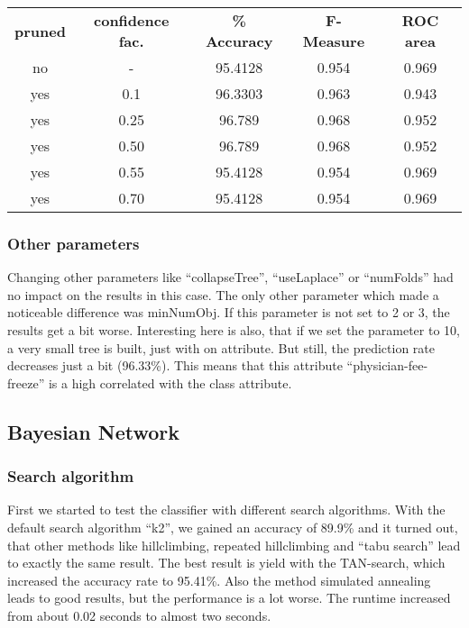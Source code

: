 \documentclass{sig-alternate-05-2015}
\begin{document}
{\begin{center}
\begin{tabular}{ c | c | c | c | c }
\textbf{pruned} & \textbf{confidence fac.} & \textbf{\% Accuracy} & \textbf{F-Measure} & \textbf{ROC area}\\
no & - & 95.4128 & 0.954 & 0.969 \\
yes & 0.1 & 96.3303 & 0.963 & 0.943 \\
yes & 0.25 & 96.789 & 0.968 & 0.952 \\	
yes & 0.50 & 96.789 & 0.968 & 0.952 \\
yes & 0.55 & 95.4128 & 0.954 & 0.969 \\
yes & 0.70 & 95.4128 & 0.954 & 0.969 \\
\end{tabular}
\end{center} 

\subsubsection{Other parameters}
 
Changing other parameters like “collapseTree”, “useLaplace” or “numFolds” had no impact on the results in this case. The only other parameter which made a noticeable difference was minNumObj. If this parameter is not set to 2 or 3, the results get a bit worse. Interesting here is also, that if we set the parameter to 10, a very small tree is built, just with on attribute. But still, the prediction rate decreases just a bit (96.33\%). This means that this attribute “physician-fee-freeze” is a high correlated with the class attribute. 
 
 
\subsection{Bayesian Network}
 
\subsubsection{Search algorithm}
 
First we started to test the classifier with different search algorithms. With the default search algorithm “k2”, we gained an accuracy of 89.9\% and it turned out, that other methods like hillclimbing, repeated hillclimbing and “tabu search” lead to exactly the same result. The best result is yield with the TAN-search, which increased the accuracy rate to 95.41\%. Also the method simulated annealing leads to good results, but the performance is a lot worse. The runtime increased from about 0.02 seconds to almost two seconds. 
 

}
\end{document}
